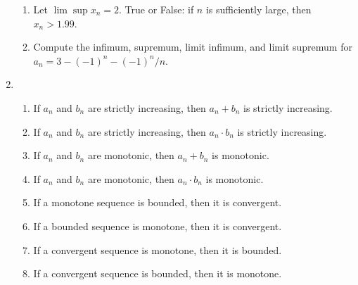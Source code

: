 \documentclass[12pt,letterpaper]{article}
\theoremstyle{case}
\theoremstyle{definition}
\begin{document}
\begin{enumerate}
\begin{enumerate}
		\item Let $\lim \sup x_n = 2$. True or False: if $n$ is sufficiently large, then $x_n > 1.99$.
		
		\item Compute the infimum, supremum, limit infimum, and limit supremum for $a_n = 3 - (-1)^n - (-1)^n/n$. 
	\end{enumerate}

	\item 
	\begin{enumerate}
		\item If $a_n$ and $b_n$ are strictly increasing, then $a_n + b_n$ is strictly increasing.
		
		\item If $a_n$ and $b_n$ are strictly increasing, then $a_n \cdot b_n$ is strictly increasing.
		
		\item If $a_n$ and $b_n$ are monotonic, then $a_n + b_n$ is monotonic.
		
		\item If $a_n$ and $b_n$ are monotonic, then $a_n \cdot b_n$ is monotonic.
		
		\item If a monotone sequence is bounded, then it is convergent.
		
		\item If a bounded sequence is monotone, then it is convergent.
		
		\item If a convergent sequence is monotone, then it is bounded.
		
		\item If a convergent sequence is bounded, then it is monotone.
	\end{enumerate}
	\end{enumerate}
\end{document}
